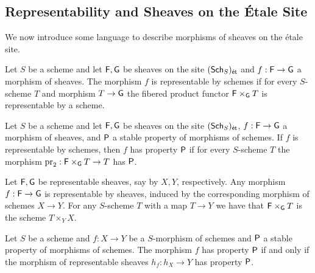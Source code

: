 \subsection{Representability and Sheaves on the \'{E}tale Site}
We now introduce some language to describe morphisms of sheaves on the \'{e}tale site. 
\begin{definition}\label{def: morphism of etale sheaves representable by schemes}
    Let $S$ be a scheme and let $\mathsf{F},\mathsf{G}$ be sheaves on the site $(\mathsf{Sch}_{S})_{\mathsf{\acute{e}t}}$ and $f:\mathsf{F}\to\mathsf{G}$ a morphism of sheaves. The morphism $f$ is representable by schemes if for every $S$-scheme $T$ and morphism $T\to \mathsf{G}$ the fibered product functor $\mathsf{F}\times_{\mathsf{G}}T$ is representable by a scheme. 
\end{definition}
\begin{definition}
    Let $S$ be a scheme and let $\mathsf{F},\mathsf{G}$ be sheaves on the site $(\mathsf{Sch}_{S})_{\mathsf{\acute{e}t}}$, $f:\mathsf{F}\to\mathsf{G}$ a morphism of sheaves, and $\mathsf{P}$ a stable property of morphisms of schemes. If $f$ is representable by schemes, then $f$ has property $\mathsf{P}$ if for every $S$-scheme $T$ the morphism $\mathrm{pr}_{2}:\mathsf{F}\times_{\mathsf{G}}T\to T$ has $\mathsf{P}$. 
\end{definition}
\begin{example}
    Let $\mathsf{F},\mathsf{G}$ be representable sheaves, say by $X,Y$, respectively. Any morphism $f:\mathsf{F}\to\mathsf{G}$ is representable by sheaves, induced by the corresponding morphism of schemes $X\to Y$. For any $S$-scheme $T$ with a map $T\to Y$ we have that $\mathsf{F}\times_{\mathsf{G}}T$ is the scheme $T\times_{Y}X$. 
\end{example}
\begin{lemma}\label{lem: morphisms of schemes and etale sheaves}
    Let $S$ be a scheme and $f:X\to Y$ be a $S$-morphism of schemes and $\mathsf{P}$ a stable property of morphisms of schemes. The morphism $f$ has property $\mathsf{P}$ if and only if the morphism of representable sheaves $h_{f}:h_{X}\to Y$ has property $\mathsf{P}$. 
\end{lemma}
